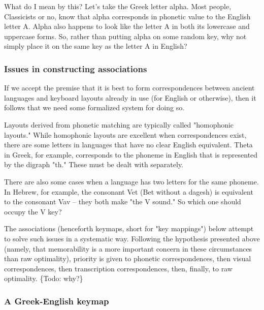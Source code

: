 \documentclass[11pt]{article}
\begin{document}
What do I mean by this? Let's take the Greek letter alpha. Most people, Classicists or no, know that alpha corresponds in phonetic value to the English letter A. Alpha also happens to look like the letter A in both its lowercase and uppercase forms. So, rather than putting alpha on some random key, why not simply place it on the same key as the letter A in English?

\subsubsection{Issues in constructing associations}
\label{sec:org6610b85}

If we accept the premise that it is best to form correspondences between ancient languages and keyboard layouts already in use (for English or otherwise), then it follows that we need some formalized system for doing so.

Layouts derived from phonetic matching are typically called "homophonic layouts." While homophonic layouts are excellent when correspondences exist, there are some letters in languages that have no clear English equivalent. Theta in Greek, for example, corresponds to the phoneme in English that is represented by the digraph "th." These must be dealt with separately.

There are also some cases when a language has two letters for the same phoneme. In Hebrew, for example, the consonant Vet (Bet without a dagesh) is equivalent to the consonant Vav -- they both make "the V sound." So which one should occupy the V key?

The associations (henceforth keymaps, short for "key mappings") below attempt to solve such issues in a systematic way. Following the hypothesis presented above (namely, that memorability is a more important concern in these circumstances than raw optimality), priority is given to phonetic correspondences, then visual correspondences, then transcription correspondences, then, finally, to raw optimality. \{Todo: why?\}

\subsubsection{A Greek-English keymap}
\label{sec:org29f5736}
\end{document}
